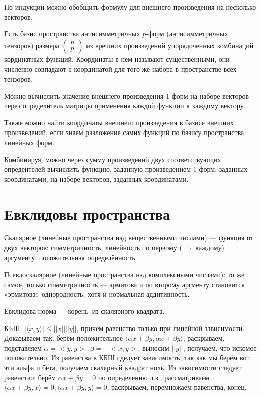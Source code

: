 \documentclass[12pt, a4paper]{article}
\begin{document}
По индукции можно обобщить формулу для внешнего произведения на несколько векторов.


Есть базис пространства антисимметричных $p$-форм (антисимметричных тензоров) 
размера $\begin{pmatrix} n \\ p \end{pmatrix}$ из врешних произведений 
упорядоченных комбинаций кординатных функций. 
Координаты в нём называют существенными, они численно совпадают 
с координатой для того же набора в пространстве всех тензоров.


Можно вычислить значение внешнего произведения 1-форм на наборе векторов через определитель 
матрицы применения каждой функции к каждому вектору.

Также можно найти координаты внешнего произведения в базисе внешних произведений, 
если знаем разложение самих функций по базису пространства линейных форм.

Комбинируя, можно через сумму произведений двух соответствующих опредеителей 
вычислить функцию, заданную произведением $1$-форм, заданных координатами, 
на наборе векторов, заданных координатами.


\section{Евклидовы пространства}

Скалярное (линейные пространства над вещественными числами) — функция от двух векторов: 
симметричность, линейность по первому ($\Rightarrow$ каждому) аргументу, 
положительная определённость.

Псевдоскалярное (линейные пространства над комплексными числами): 
то же самое, только симметричность — эрмитова и по второму аргменту становится 
«эрмитова» однородность, хотя и нормальная аддитивность.

Евклидова норма — корень из скалярного квадрата.

КБШ: $| \langle x, y \rangle | \leqslant ||x|| ||y||$, причём равенство только при линейной зависимости.
Доказываем так: берём положительное $\langle \alpha x + \beta y, \alpha x + \beta y \rangle$, раскрываем, подставляем
$\alpha = <y, y>, \beta = -<x, y>$, выносим $||y||$, получаем, что искомое положительно.
Из равенства в КБШ сдедует зависимость, так как мы берём вот эти альфа и бета, получаем скалярный квадрат ноль.
Из зависимости следует равенство: берём $\alpha x + \beta y = 0$ по определению л.з., 
рассматриваем $\langle\alpha x+\beta y, x\rangle=0; \langle\alpha x+\beta y, y\rangle=0$, раскрываем, перемножаем равенства, конец.
\end{document}
